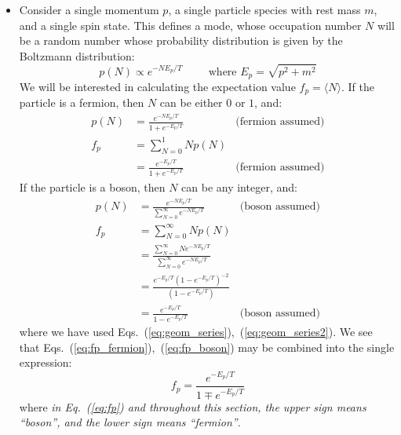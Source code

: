 \documentclass[aps,prd,superscriptaddress,groupedaddress,nofootinbib,nobibnotes]{revtex4}
\newcommand{\be}{\begin{equation}}
\newcommand{\ee}{\end{equation}}
\newcommand{\nn}{\nonumber}
\begin{document}
\begin{itemize}
\item 
Consider a single momentum $p$, a single particle species with rest mass $m$, and a single spin state.
This defines a mode, whose occupation number $N$ will be a random number whose probability distribution
is given by the Boltzmann distribution:
\be
p(N) \propto e^{-NE_p/T}
  \hspace{1cm}
\mbox{where $E_p = \sqrt{p^2+m^2}$}
\ee
We will be interested in calculating the expectation value $f_p = \langle N \rangle$.
If the particle is a fermion, then $N$ can be either $0$ or $1$, and:
\begin{align}
p(N) &= \frac{e^{-NE_p/T}}{1 + e^{-E_p/T}}  & \mbox{(fermion assumed)}  \\
f_p &= \sum_{N=0}^1 N p(N) \nn \\
   &= \frac{e^{-E_p/T}}{1 + e^{-E_p/T}} & \mbox{(fermion assumed)}  \label{eq:fp_fermion}
\end{align}
If the particle is a boson, then $N$ can be any integer, and:
\begin{align}
p(N) &= \frac{e^{-NE_p/T}}{\sum_{N=0}^\infty e^{-NE_p/T}} & \mbox{(boson assumed)} \\
f_p &= \sum_{N=0}^\infty N p(N) \nn \\
 &= \frac{\sum_{N=0}^\infty N e^{-NE_p/T}}{\sum_{N=0}^\infty e^{-NE_p/T}} \nn \\
 &= \frac{e^{-E_p/T} (1 - e^{-E_p/T})^{-2}}{(1 - e^{-E_p/T})} \nn \\
 &= \frac{e^{-E_p/T}}{1 - e^{-E_p/T}} & \mbox{(boson assumed)}  \label{eq:fp_boson}
\end{align}
where we have used Eqs.~(\ref{eq:geom_series}),~(\ref{eq:geom_series2}).
We see that Eqs.~(\ref{eq:fp_fermion}),~(\ref{eq:fp_boson}) may be combined into the single expression:
\be
f_p = \frac{e^{-E_p/T}}{1 \mp e^{-E_p/T}} \label{eq:fp}
\ee
where {\em in Eq.~(\ref{eq:fp}) and throughout this section, the upper sign means ``boson'', and the lower sign means ``fermion''}.


\end{itemize}
\end{document}
